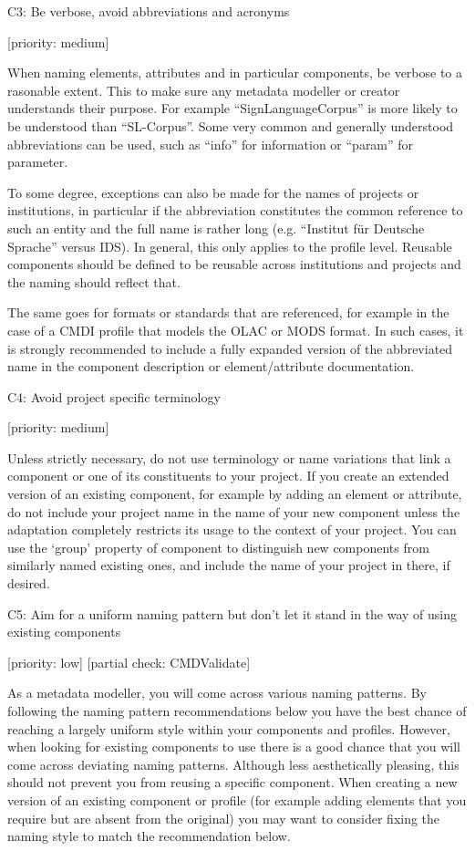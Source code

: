 \documentclass[]{article}
\begin{document}
C3: Be verbose, avoid abbreviations and acronyms

{[}priority: medium{]}

When naming elements, attributes and in particular components, be
verbose to a rasonable extent. This to make sure any metadata modeller
or creator understands their purpose. For example ``SignLanguageCorpus''
is more likely to be understood than ``SL-Corpus''. Some very common and
generally understood abbreviations can be used, such as ``info'' for
information or ``param'' for parameter.

To some degree, exceptions can also be made for the names of projects or
institutions, in particular if the abbreviation constitutes the common
reference to such an entity and the full name is rather long (e.g.
``Institut für Deutsche Sprache'' versus IDS). In general, this only
applies to the profile level. Reusable components should be defined to
be reusable across institutions and projects and the naming should
reflect that.

The same goes for formats or standards that are referenced, for example
in the case of a CMDI profile that models the OLAC or MODS format. In
such cases, it is strongly recommended to include a fully expanded
version of the abbreviated name in the component description or
element/attribute documentation.

C4: Avoid project specific terminology

{[}priority: medium{]}

Unless strictly necessary, do not use terminology or name variations
that link a component or one of its constituents to your project. If you
create an extended version of an existing component, for example by
adding an element or attribute, do not include your project name in the
name of your new component unless the adaptation completely restricts
its usage to the context of your project. You can use the `group'
property of component to distinguish new components from similarly named
existing ones, and include the name of your project in there, if
desired.

C5: Aim for a uniform naming pattern but don't let it stand in the way
of using existing components

{[}priority: low{]} {[}partial check: CMDValidate{]}

As a metadata modeller, you will come across various naming patterns. By
following the naming pattern recommendations below you have the best
chance of reaching a largely uniform style within your components and
profiles. However, when looking for existing components to use there is
a good chance that you will come across deviating naming patterns.
Although less aesthetically pleasing, this should not prevent you from
reusing a specific component. When creating a new version of an existing
component or profile (for example adding elements that you require but
are absent from the original) you may want to consider fixing the naming
style to match the recommendation below.
\end{document}
